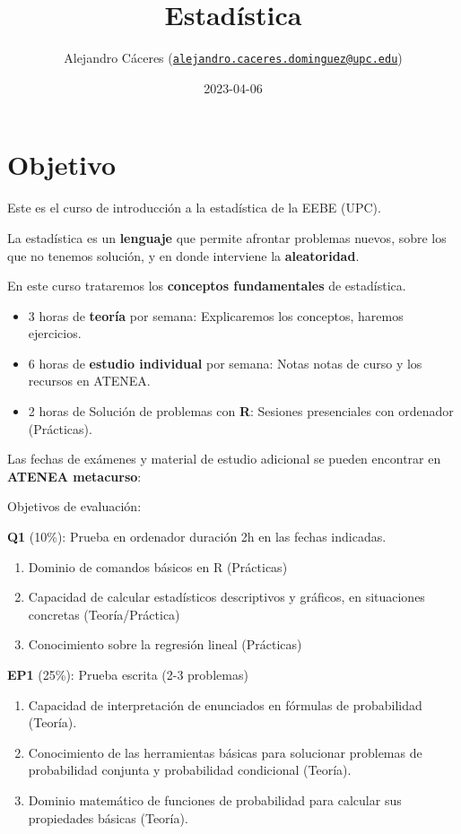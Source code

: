 \documentclass[
]{book}
\title{Estadística}
\author{Alejandro Cáceres (\href{mailto:alejandro.caceres.dominguez@upc.edu}{\nolinkurl{alejandro.caceres.dominguez@upc.edu}})}
\date{2023-04-06}
\providecommand{\tightlist}{%
  \setlength{\itemsep}{0pt}\setlength{\parskip}{0pt}}
\begin{document}
\maketitle

{
\setcounter{tocdepth}{1}
\tableofcontents
}
\hypertarget{objetivo}{%
\chapter{Objetivo}\label{objetivo}}

Este es el curso de introducción a la estadística de la EEBE (UPC).

La estadística es un \textbf{lenguaje} que permite afrontar problemas nuevos, sobre los que no tenemos solución, y en donde interviene la \textbf{aleatoridad}.

En este curso trataremos los \textbf{conceptos fundamentales} de estadística.

\begin{itemize}
\item
  3 horas de \textbf{teoría} por semana: Explicaremos los conceptos, haremos ejercicios.
\item
  6 horas de \textbf{estudio individual} por semana: Notas notas de curso y los recursos en ATENEA.
\item
  2 horas de Solución de problemas con \textbf{R}: Sesiones presenciales con ordenador (Prácticas).
\end{itemize}

Las fechas de exámenes y material de estudio adicional se pueden encontrar en \textbf{ATENEA metacurso}:

Objetivos de evaluación:

\textbf{Q1} (10\%): Prueba en ordenador duración 2h en las fechas indicadas.

\begin{enumerate}
\def\labelenumi{\alph{enumi}.}
\tightlist
\item
  Dominio de comandos básicos en R (Prácticas)
\item
  Capacidad de calcular estadísticos descriptivos y gráficos, en situaciones concretas (Teoría/Práctica)
\item
  Conocimiento sobre la regresión lineal (Prácticas)
\end{enumerate}

\textbf{EP1} (25\%): Prueba escrita (2-3 problemas)

\begin{enumerate}
\def\labelenumi{\alph{enumi}.}
\tightlist
\item
  Capacidad de interpretación de enunciados en fórmulas de probabilidad (Teoría).
\item
  Conocimiento de las herramientas básicas para solucionar problemas de probabilidad conjunta y probabilidad condicional (Teoría).
\item
  Dominio matemático de funciones de probabilidad para calcular sus propiedades básicas (Teoría).
\end{enumerate}
\end{document}
